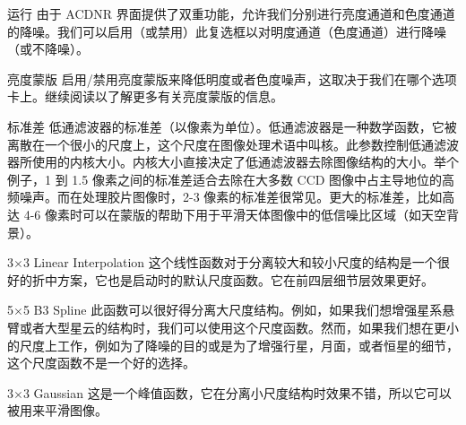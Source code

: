 \begin{nounexplanation}
  \item[运行\translate{Apply}] 由于 ACDNR 界面提供了双重功能，允许我们分别进行亮度通道和色度通道的降噪。我们可以启用（或禁用）此复选框以对明度通道（色度通道）进行降噪（或不降噪）。

  \item[亮度蒙版\translate{Lightness mask}] 启用/禁用亮度蒙版来降低明度或者色度噪声，这取决于我们在哪个选项卡上。继续阅读以了解更多有关亮度蒙版的信息。
  
  \item[标准差\translate{Std.Dev.}] 低通滤波器的标准差（以像素为单位）。低通滤波器是一种数学函数，它被离散在一个很小的尺度上，这个尺度在图像处理术语中叫核。此参数控制低通滤波器所使用的内核大小。内核大小直接决定了低通滤波器去除图像结构的大小。举个例子，1 到 1.5 像素之间的标准差适合去除在大多数 CCD 图像中占主导地位的高频噪声。而在处理胶片图像时，2-3 像素的标准差很常见。更大的标准差，比如高达 4-6 像素时可以在蒙版的帮助下用于平滑天体图像中的低信噪比区域（如天空背景）。
    \begin{nounexplanation}
      \item[3$\times$3 Linear Interpolation] 这个线性函数对于分离较大和较小尺度的结构是一个很好的折中方案，它也是启动时的默认尺度函数。它在前四层细节层效果更好。
      \item[5$\times$5 B3 Spline] 此函数可以很好得分离大尺度结构。例如，如果我们想增强星系悬臂或者大型星云的结构时，我们可以使用这个尺度函数。然而，如果我们想在更小的尺度上工作，例如为了降噪的目的或是为了增强行星，月面，或者恒星的细节，这个尺度函数不是一个好的选择。
      \item[3$\times$3 Gaussian] 这是一个峰值函数，它在分离小尺度结构时效果不错，所以它可以被用来平滑图像。
    \end{nounexplanation}
\end{nounexplanation}


